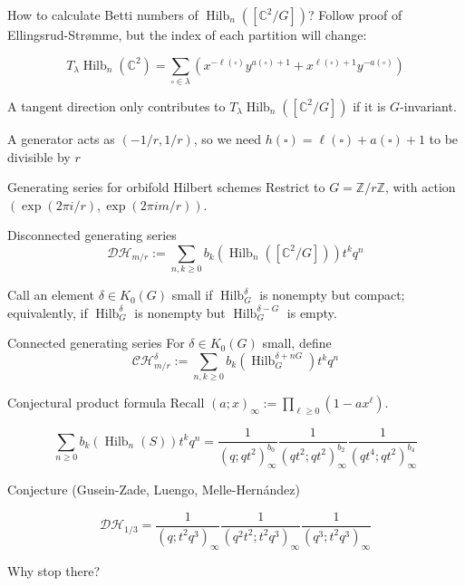 \documentclass{beamer}
\DeclareMathOperator{\Hilb}{Hilb}
\newcommand{\C}{\mathbb{C}}
\newcommand{\Z}{\mathbb{Z}}
\begin{document}
\begin{frame}{How to calculate Betti numbers of $\Hilb_n([\C^2/G])$?}
Follow proof of Ellingsrud-Str\o mme, but the index of each partition will change:

\begin{Lemma}
$$T_\lambda \Hilb_n(\C^2)=\sum_{\square\in\lambda} \left(x^{-\ell(\square)} y^{a(\square)+1}+x^{\ell(\square)+1}y^{-a(\square)}\right)$$
\end{Lemma}

A tangent direction only contributes to $T_\lambda \Hilb_n([\C^2/G])$ if it is $G$-invariant.  
\begin{example}[Balanced $\Z_r$ action]
A generator acts as $(-1/r,1/r)$, so we need $h(\square)=\ell(\square)+a(\square)+1$ to be divisible by $r$
\end{example}

\end{frame}



\begin{frame}{Generating series for orbifold Hilbert schemes}
Restrict to $G=\Z/r\Z$, with action $(\exp(2\pi i /r),\exp(2\pi i m/r))$.
\begin{block}{Disconnected generating series}
$$\mathcal{DH}_{m/r}:=\sum_{n,k\geq 0 } b_k(\Hilb_n([\C^2/G])) t^kq^n$$
\end{block}
Call an element $\delta\in K_0(G)$ small if $\Hilb^\delta_G$ is nonempty but compact; equivalently, if $\Hilb^\delta_G$ is nonempty but $\Hilb^{\delta-G}_G$ is empty.

\begin{block}{Connected generating series}
For $\delta\in K_0(G)$ small, define 
$$\mathcal{CH}^\delta_{m/r}:=\sum_{n,k\geq 0} b_k(\Hilb^{\delta+nG}_G)t^kq^n$$
\end{block}
\end{frame}





\begin{frame}{Conjectural product formula}
Recall $(a;x)_\infty:=\prod_{\ell\geq 0} (1-ax^\ell)$.
\begin{example}[G\"ottsche]
$$\sum_{n\geq 0} b_k(\Hilb_n(S))t^kq^n=
\frac{1}{(q;qt^2)_\infty^{b_0}}\frac{1}{(qt^2;qt^2)_\infty^{b_2}}\frac{1}{(qt^4;qt^2)_\infty^{b_4}}$$
\end{example}
\begin{block}{Conjecture (Gusein-Zade, Luengo, Melle-Hern\'andez)}

$$\mathcal{DH}_{1/3}=\frac{1}{(q;t^2q^3)_\infty}\frac{1}{(q^2t^2;t^2q^3)_\infty}\frac{1}{(q^3;t^2q^3)_\infty}$$
\end{block}
\begin{block}{Why stop there?} 
\end{block}
\end{frame}
\end{document}

